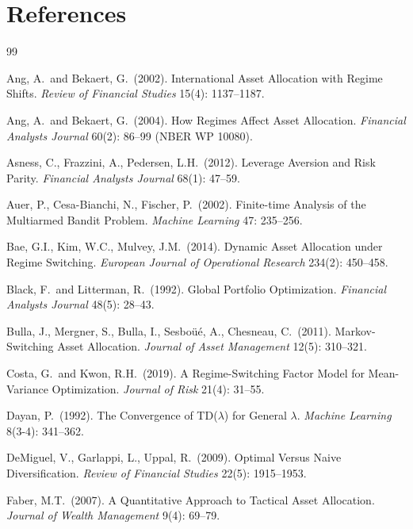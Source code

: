 \documentclass[11pt]{article}
\theoremstyle{plain1}
\theoremstyle{definition1}
\newcommand{\1}{\mathbf{1}}
\begin{document}
\section{References}\label{sec:refs}

\begin{thebibliography}{99}
\small\setlength{\itemsep}{0pt}

 Ang, A.\ and Bekaert, G.\ (2002). International Asset Allocation with Regime Shifts. \emph{Review of Financial Studies} 15(4): 1137--1187.

 Ang, A.\ and Bekaert, G.\ (2004). How Regimes Affect Asset Allocation. \emph{Financial Analysts Journal} 60(2): 86--99 (NBER WP 10080).

 Asness, C., Frazzini, A., Pedersen, L.H.\ (2012). Leverage Aversion and Risk Parity. \emph{Financial Analysts Journal} 68(1): 47--59.

 Auer, P., Cesa-Bianchi, N., Fischer, P.\ (2002). Finite-time Analysis of the Multiarmed Bandit Problem. \emph{Machine Learning} 47: 235--256.

 Bae, G.I., Kim, W.C., Mulvey, J.M.\ (2014). Dynamic Asset Allocation under Regime Switching. \emph{European Journal of Operational Research} 234(2): 450--458.

 Black, F.\ and Litterman, R.\ (1992). Global Portfolio Optimization. \emph{Financial Analysts Journal} 48(5): 28--43.

 Bulla, J., Mergner, S., Bulla, I., Sesbo\"u\'e, A., Chesneau, C.\ (2011). Markov-Switching Asset Allocation. \emph{Journal of Asset Management} 12(5): 310--321.

 Costa, G.\ and Kwon, R.H.\ (2019). A Regime-Switching Factor Model for Mean-Variance Optimization. \emph{Journal of Risk} 21(4): 31--55.

 Dayan, P.\ (1992). The Convergence of TD($\lambda$) for General $\lambda$. \emph{Machine Learning} 8(3-4): 341--362.

 DeMiguel, V., Garlappi, L., Uppal, R.\ (2009). Optimal Versus Naive Diversification. \emph{Review of Financial Studies} 22(5): 1915--1953.

 Faber, M.T.\ (2007). A Quantitative Approach to Tactical Asset Allocation. \emph{Journal of Wealth Management} 9(4): 69--79.


\end{thebibliography}
\end{document}

